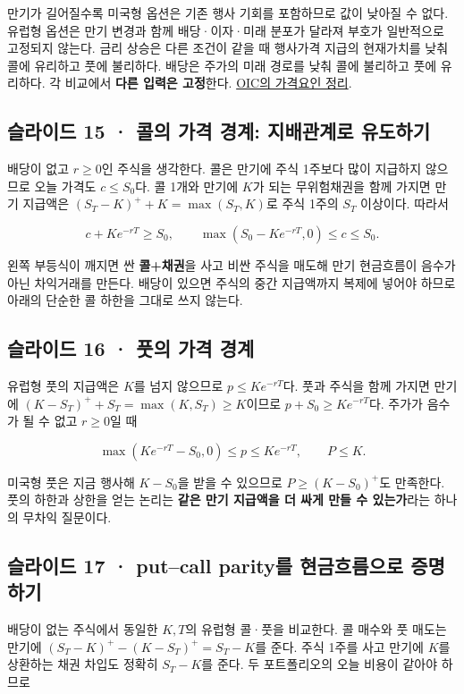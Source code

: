\documentclass[11pt,a4paper]{article}
\begin{document}
만기가 길어질수록 미국형 옵션은 기존 행사 기회를 포함하므로 값이 낮아질 수 없다. 유럽형 옵션은 만기 변경과 함께 배당·이자·미래 분포가 달라져 부호가 일반적으로 고정되지 않는다. 금리 상승은 다른 조건이 같을 때 행사가격 지급의 현재가치를 낮춰 콜에 유리하고 풋에 불리하다. 배당은 주가의 미래 경로를 낮춰 콜에 불리하고 풋에 유리하다. 각 비교에서 \textbf{다른 입력은 고정}한다. \href{https://www.optionseducation.org/referencelibrary/faq/option-price-behavior}{OIC의 가격요인 정리}.\par

\subsection{슬라이드 15 · 콜의 가격 경계: 지배관계로 유도하기}
배당이 없고 $r\geq0$인 주식을 생각한다. 콜은 만기에 주식 1주보다 많이 지급하지 않으므로 오늘 가격도 $c\leq S_0$다. 콜 1개와 만기에 $K$가 되는 무위험채권을 함께 가지면 만기 지급액은 $(S_T-K)^++K=\max(S_T,K)$로 주식 1주의 $S_T$ 이상이다. 따라서\par

\[
c+Ke^{-rT}\geq S_0,\qquad
\max(S_0-Ke^{-rT},0)\leq c\leq S_0.
\]

왼쪽 부등식이 깨지면 싼 \textbf{콜+채권}을 사고 비싼 주식을 매도해 만기 현금흐름이 음수가 아닌 차익거래를 만든다. 배당이 있으면 주식의 중간 지급액까지 복제에 넣어야 하므로 아래의 단순한 콜 하한을 그대로 쓰지 않는다.\par

\subsection{슬라이드 16 · 풋의 가격 경계}
유럽형 풋의 지급액은 $K$를 넘지 않으므로 $p\leq Ke^{-rT}$다. 풋과 주식을 함께 가지면 만기에 $(K-S_T)^++S_T=\max(K,S_T)\geq K$이므로 $p+S_0\geq Ke^{-rT}$다. 주가가 음수가 될 수 없고 $r\geq0$일 때\par

\[
\max(Ke^{-rT}-S_0,0)\leq p\leq Ke^{-rT},\qquad P\leq K.
\]

미국형 풋은 지금 행사해 $K-S_0$을 받을 수 있으므로 $P\geq(K-S_0)^+$도 만족한다. 풋의 하한과 상한을 얻는 논리는 \textbf{같은 만기 지급액을 더 싸게 만들 수 있는가}라는 하나의 무차익 질문이다.\par

\subsection{슬라이드 17 · put–call parity를 현금흐름으로 증명하기}
배당이 없는 주식에서 동일한 $K,T$의 유럽형 콜·풋을 비교한다. 콜 매수와 풋 매도는 만기에 $(S_T-K)^+-(K-S_T)^+=S_T-K$를 준다. 주식 1주를 사고 만기에 $K$를 상환하는 채권 차입도 정확히 $S_T-K$를 준다. 두 포트폴리오의 오늘 비용이 같아야 하므로\par
\end{document}
